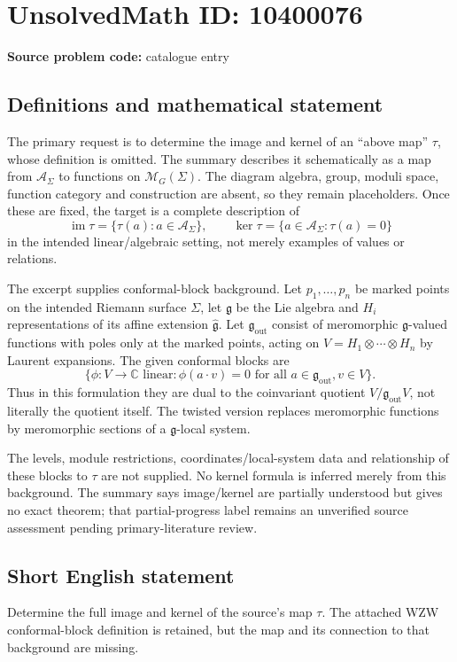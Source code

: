 \documentclass[11pt]{article}
\begin{document}
\section*{UnsolvedMath ID: 10400076}
\textbf{Source problem code:} catalogue entry
\subsection{Definitions and mathematical statement}
The primary request is to determine the image and kernel of an ``above map'' \(\tau\), whose definition is omitted. The summary describes it schematically as a map from \(\mathcal A_\Sigma\) to functions on \(\mathcal M_G(\Sigma)\). The diagram algebra, group, moduli space, function category and construction are absent, so they remain placeholders. Once these are fixed, the target is a complete description of
\[
 \operatorname{im}\tau=\{\tau(a):a\in\mathcal A_\Sigma\},\qquad
 \ker\tau=\{a\in\mathcal A_\Sigma:\tau(a)=0\}
\]
in the intended linear/algebraic setting, not merely examples of values or relations.

The excerpt supplies conformal-block background. Let \(p_1,\ldots,p_n\) be marked points on the intended Riemann surface \(\Sigma\), let \(\mathfrak g\) be the Lie algebra and \(H_i\) representations of its affine extension \(\widehat{\mathfrak g}\). Let \(\mathfrak g_{\mathrm{out}}\) consist of meromorphic \(\mathfrak g\)-valued functions with poles only at the marked points, acting on \(V=H_1\otimes\cdots\otimes H_n\) by Laurent expansions. The given conformal blocks are
\[
 \{\phi:V\to\mathbb C\text{ linear}:\phi(a\cdot v)=0
 \text{ for all }a\in\mathfrak g_{\mathrm{out}},v\in V\}.
\]
Thus in this formulation they are dual to the coinvariant quotient \(V/\mathfrak g_{\mathrm{out}}V\), not literally the quotient itself. The twisted version replaces meromorphic functions by meromorphic sections of a \(\mathfrak g\)-local system.

The levels, module restrictions, coordinates/local-system data and relationship of these blocks to \(\tau\) are not supplied. No kernel formula is inferred merely from this background. The summary says image/kernel are partially understood but gives no exact theorem; that partial-progress label remains an unverified source assessment pending primary-literature review.
\subsection{Short English statement}
Determine the full image and kernel of the source's map \(\tau\). The attached WZW conformal-block definition is retained, but the map and its connection to that background are missing.
\end{document}

